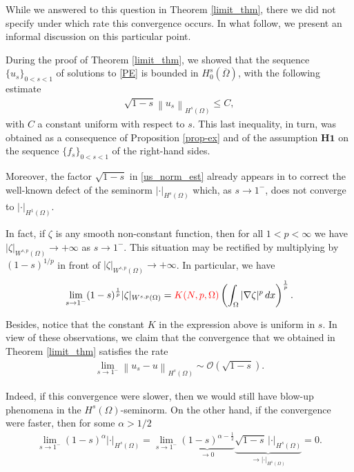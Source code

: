 \documentclass[reqno,twoside]{amsart}
\numberwithin{equation}{section}
\newcommand{\norm}[2]{{\left\|#1\right\|}_{#2}}
\newcommand{\rouge}[1]{{\color{red}#1}}
\begin{document}
While we answered to this question in Theorem \ref{limit_thm}, there we did not specify under which rate this convergence occurs. In what follow, we present an informal discussion on this particular point. 

During the proof of Theorem \eqref{limit_thm}, we showed that the sequence $\{u_s\}_{0<s<1}$ of solutions to \eqref{PE} is bounded in $H_0^s(\overline{\Omega})$, with the following estimate 
\begin{align}\label{us_norm_est}
	\sqrt{1-s}\norm{u_s}{H^s(\Omega)}\leq C,
\end{align}
with $C$ a constant uniform with respect to $s$. This last inequality, in turn, was obtained as a consequence of Proposition \ref{prop-ex} and of the assumption $\mathbf{H1}$ on the sequence $\{f_s\}_{0<s<1}$ of the right-hand sides. 

Moreover, the factor $\sqrt{1-s}$ in \eqref{us_norm_est} already appears in \cite{bourgain2001another} to correct the well-known defect
of the seminorm $|\cdot|_{H^s(\Omega)}$ which, as $s\to 1^-$, does not converge to $|\cdot|_{H^1(\Omega)}$. 

In fact, if $\zeta$ is any smooth non-constant function, then for all $1< p<\infty$ we have $|\zeta|_{W^{s,p}(\Omega)}\to +\infty$ as $s\to 1^-$. This situation may be rectified by multiplying by $(1 -s)^{1/p}$ in front of $|\zeta|_{W^{s,p}(\Omega)}\to +\infty$. In particular, we have 
\begin{align}\label{conv_weighted}
	\lim_{s\to 1^-} (1-s)^{\frac 1p}|\zeta|_{W^{s,p}(\Omega)} = \rouge{K(N,p,\Omega)}\left(\int_\Omega |\nabla\zeta|^p\,dx\right)^{\frac 1p}. 
\end{align}

\rouge{Besides, notice that the constant $K$ in the expression above is uniform in $s$.} In view of these observations, we claim that the convergence that we obtained in Theorem \ref{limit_thm} satisfies the rate
\begin{align*}
	\lim_{s\to 1^-}\norm{u_s-u}{H^s(\Omega)} \sim \mathcal O(\sqrt{1-s}).
\end{align*}

Indeed, if this convergence were slower, then we would still have blow-up phenomena in the $H^s(\Omega)$-seminorm. On the other hand, if the convergence were faster, then for some $\alpha>1/2$
\begin{align*}
	\lim_{s\to 1^-}(1-s)^{\alpha}|\cdot|_{H^s(\Omega)} = \lim_{s\to 1^-}\underbrace{(1-s)^{\alpha-\frac 12}}_{\to 0}\underbrace{\sqrt{1-s}\,|\cdot|_{H^s(\Omega)}}_{\to |\cdot|_{H^1(\Omega)}}  = 0.
\end{align*}
\end{document}
